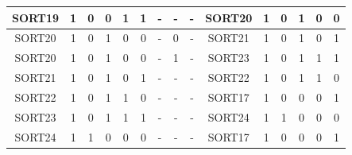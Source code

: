 \begin{table}[H]
{\begin{tabular}{|cccccc|ccc|cccccc|}
\multicolumn{1}{|c|}{SORT19}  & \multicolumn{1}{c|}{1}  & \multicolumn{1}{c|}{0}  & \multicolumn{1}{c|}{0}  & \multicolumn{1}{c|}{1}  & 1  & \multicolumn{1}{c|}{-}    & \multicolumn{1}{c|}{-}        & -    & \multicolumn{1}{c|}{SORT20}  & \multicolumn{1}{c|}{1}  & \multicolumn{1}{c|}{0}  & \multicolumn{1}{c|}{1}  & \multicolumn{1}{c|}{0}  & 0  \\ \hline
\multicolumn{1}{|c|}{SORT20}  & \multicolumn{1}{c|}{1}  & \multicolumn{1}{c|}{0}  & \multicolumn{1}{c|}{1}  & \multicolumn{1}{c|}{0}  & 0  & \multicolumn{1}{c|}{-}    & \multicolumn{1}{c|}{0}        & -    & \multicolumn{1}{c|}{SORT21}  & \multicolumn{1}{c|}{1}  & \multicolumn{1}{c|}{0}  & \multicolumn{1}{c|}{1}  & \multicolumn{1}{c|}{0}  & 1  \\ \hline
\multicolumn{1}{|c|}{SORT20}  & \multicolumn{1}{c|}{1}  & \multicolumn{1}{c|}{0}  & \multicolumn{1}{c|}{1}  & \multicolumn{1}{c|}{0}  & 0  & \multicolumn{1}{c|}{-}    & \multicolumn{1}{c|}{1}        & -    & \multicolumn{1}{c|}{SORT23}  & \multicolumn{1}{c|}{1}  & \multicolumn{1}{c|}{0}  & \multicolumn{1}{c|}{1}  & \multicolumn{1}{c|}{1}  & 1  \\ \hline
\multicolumn{1}{|c|}{SORT21}  & \multicolumn{1}{c|}{1}  & \multicolumn{1}{c|}{0}  & \multicolumn{1}{c|}{1}  & \multicolumn{1}{c|}{0}  & 1  & \multicolumn{1}{c|}{-}    & \multicolumn{1}{c|}{-}        & -    & \multicolumn{1}{c|}{SORT22}  & \multicolumn{1}{c|}{1}  & \multicolumn{1}{c|}{0}  & \multicolumn{1}{c|}{1}  & \multicolumn{1}{c|}{1}  & 0  \\ \hline
\multicolumn{1}{|c|}{SORT22}  & \multicolumn{1}{c|}{1}  & \multicolumn{1}{c|}{0}  & \multicolumn{1}{c|}{1}  & \multicolumn{1}{c|}{1}  & 0  & \multicolumn{1}{c|}{-}    & \multicolumn{1}{c|}{-}        & -    & \multicolumn{1}{c|}{SORT17}  & \multicolumn{1}{c|}{1}  & \multicolumn{1}{c|}{0}  & \multicolumn{1}{c|}{0}  & \multicolumn{1}{c|}{0}  & 1  \\ \hline
\multicolumn{1}{|c|}{SORT23}  & \multicolumn{1}{c|}{1}  & \multicolumn{1}{c|}{0}  & \multicolumn{1}{c|}{1}  & \multicolumn{1}{c|}{1}  & 1  & \multicolumn{1}{c|}{-}    & \multicolumn{1}{c|}{-}        & -    & \multicolumn{1}{c|}{SORT24}  & \multicolumn{1}{c|}{1}  & \multicolumn{1}{c|}{1}  & \multicolumn{1}{c|}{0}  & \multicolumn{1}{c|}{0}  & 0  \\ \hline
\multicolumn{1}{|c|}{SORT24}  & \multicolumn{1}{c|}{1}  & \multicolumn{1}{c|}{1}  & \multicolumn{1}{c|}{0}  & \multicolumn{1}{c|}{0}  & 0  & \multicolumn{1}{c|}{-}    & \multicolumn{1}{c|}{-}        & -    & \multicolumn{1}{c|}{SORT17}  & \multicolumn{1}{c|}{1}  & \multicolumn{1}{c|}{0}  & \multicolumn{1}{c|}{0}  & \multicolumn{1}{c|}{0}  & 1  \\ \hline

\end{tabular}}
\end{table}

